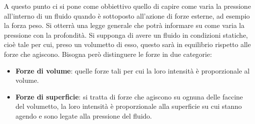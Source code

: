 \documentclass[10pt,a4paper]{book}
\begin{document}
A questo punto ci si pone come obbiettivo quello di capire come varia la pressione all'interno di un fluido quando è sottoposto all'azione di forze esterne, ad esempio la forza peso. Si otterrà una legge generale che potrà informare su come varia la pressione con la profondità.
Si supponga di avere un fluido in condizioni statiche, cioè tale per cui, preso un volumetto di esso, questo sarà in equilibrio rispetto alle forze che agiscono. Bisogna però distinguere le forze in due categorie:
\begin{itemize}
	\item \textbf{Forze di volume}: quelle forze tali per cui la loro intensità è proporzionale al volume.
	\item \textbf{Forze di superficie}: si tratta di forze che agiscono su ognuna delle faccine del volumetto, la loro intensità è proporzionale alla superficie su cui stanno agendo e sono legate alla pressione del fluido.
\end{itemize}
\end{document}
